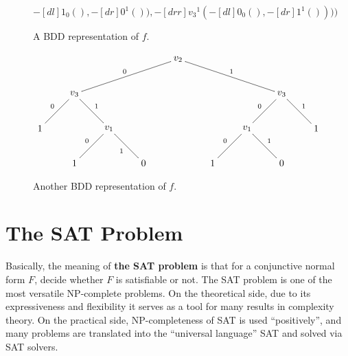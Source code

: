 \documentclass[12pt]{book}
\begin{document}
\begin{examp}
\begin{figure}[h]
\begin{displaymath}
{                  - [dl]{1}_0 (),
                  - [dr]{0}^1 ()
                  ),
                  -[drr]{v_3}^1 (
                  - [dl]{0}_0 (),
                  - [dr]{1}^1 ()
                  )
                  )
                  )
                  }
            \end{displaymath}
            \caption{A BDD representation of $f$.}
            \label{fig:BooleanFunctionDTExampDT1}
      \end{figure}
      \begin{figure}[h]
            \centering
            \begin{displaymath}
                  \xygraph{
                 []{v_2} ( 
                 - [dlll]{v_3}_0 (
                 - [dl]{1}_0 (),
                 - [dr]{v_1}^1 (
                 - [dl]{1}_0 (),
                 - [dr]{0}_1 ()
                 )
                 ),
                 - [drrr]{v_3}^1 (
                 - [dl]{v_1}_0 (
                 - [dl]{1}_0 (),
                 - [dr]{0}^1 ()
                 ),
                 -[dr]{1}^1 ()
                 )
                 )
                 }
            \end{displaymath}
           \caption{Another BDD representation of $f$.}
           \label{fig:BooleanFunctionDTExampDT2}
      \end{figure}
\end{examp}
\section{The SAT Problem}
\label{sec:The SAT Problem}

\begin{defi}\label{def:sat} Basically, the meaning of \textbf{the SAT problem} is that for a conjunctive normal form $F$, decide whether $F$ is satisfiable or not.
      The SAT problem is one of the most versatile NP-complete problems. On the theoretical side, due to its expressiveness and flexibility it 
      serves as a tool for many results in complexity theory. On the practical side, NP-completeness of SAT is used “positively”, and many problems 
      are translated into  the “universal language” SAT and solved via SAT solvers. 
\end{defi}
\end{document}
